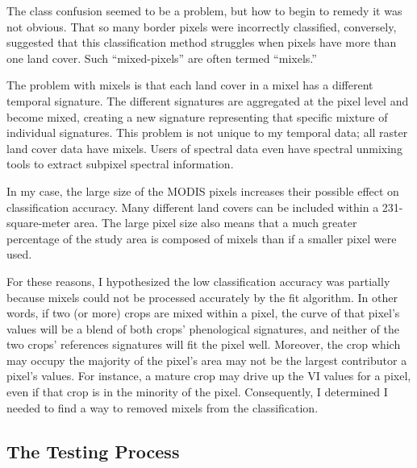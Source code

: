 
The class confusion seemed to be a problem, but how to begin to remedy it was not obvious. That so many border pixels were incorrectly classified, conversely, suggested that this classification method struggles when pixels have more than one land cover. Such ``mixed-pixels'' are often termed ``mixels.''

The problem with mixels is that each land cover in a mixel has a different temporal signature. The different signatures are aggregated at the pixel level and become mixed, creating a new signature representing that specific mixture of individual signatures. This problem is not unique to my temporal data; all raster land cover data have mixels. Users of spectral data even have spectral unmixing tools to extract subpixel spectral information.

In my case, the large size of the MODIS pixels increases their possible effect on classification accuracy. Many different land covers can be included within a 231-square-meter area. The large pixel size also means that a much greater percentage of the study area is composed of mixels than if a smaller pixel were used.

For these reasons, I hypothesized the low classification accuracy was partially because mixels could not be processed accurately by the fit algorithm. In other words, if two (or more) crops are mixed within a pixel, the curve of that pixel’s values will be a blend of both crops’ phenological signatures, and neither of the two crops' references signatures will fit the pixel well. Moreover, the crop which may occupy the majority of the pixel's area may not be the largest contributor a pixel’s values. For instance, a mature crop may drive up the VI values for a pixel, even if that crop is in the minority of the pixel. Consequently, I determined I needed to find a way to removed mixels from the classification.


\subsection*{The Testing Process}


